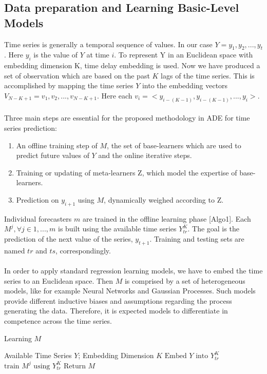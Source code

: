 \documentclass[runningheads,a4paper]{llncs}[2015/06/24]
\begin{document}
\subsection{Data preparation and Learning Basic-Level Models}
Time series is generally a temporal sequence of values. In our case $Y={y_1,y_2,...,y_t}$. Here $y_i$ is the value of $Y$ at time $i$. To represent Y in an Euclidean space with embedding dimension K, time delay embedding is used. Now we have produced a set of observation which are based on the past $K$ lags of the time series. This is accomplished by mapping the time series $Y$ into the embedding vectors $V_{N-K+1} = {v_1,v_2,...,v_{N-K+1}}$. Here each $v_i = <y_{i-(K-1)},y_{i-(K-1)},...,y_i>$. \\\\ Three main steps are essential for the proposed methodology in ADE for time series prediction:
\begin{enumerate}
\item An offline training step of $M$, the set of base-learners which are used to predict future values of $Y$ and the online iterative steps.
\item Training or updating of meta-learners Z, which model the expertise of base-learners.
\item Prediction on $y_{i+1}$ using $M$, dynamically weighed according to Z.
\end{enumerate}
Individual forecasters $m$ are trained in the offline learning phase [Algo1]. Each $M^j, ∀j ∈ {1,...,m}$ is built using the available time series $Y^K_{tr}$. The goal is the prediction of the next value of the series, $y_{t+1}$. Training and testing sets are named $tr$ and $ts$, correspondingly. \\\\ In order to apply standard regression learning models, we have to embed the time series to an Euclidean space. Then $M$ is comprised by a set of heterogeneous models, like for example Neural Networks and Gaussian Processes. Such models provide different inductive biases and assumptions regarding the process generating the data. Therefore, it is expected models to differentiate in competence across the time series.

\begin{algorithm}[h]

\caption{Learning $M$}\label{alg:learning}
\begin{algorithmic}[1]

\Require Available Time Series $Y$; Embedding Dimension $K$
\State $\text{Embed $Y$ into $Y_{tr}^{K}$}$
\State $\text{train $M^j$ using $Y_{tr}^K$}$
\EndFor
\State $\text{Return $M$}$
\end{algorithmic}
\end{algorithm}
\end{document}
